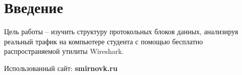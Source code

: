 \section{Введение}

Цель работы – изучить структуру протокольных блоков данных, анализируя реальный трафик на компьютере студента с помощью бесплатно распространяемой утилиты Wireshark.

Использованный сайт: \textbf{smirnovk.ru}